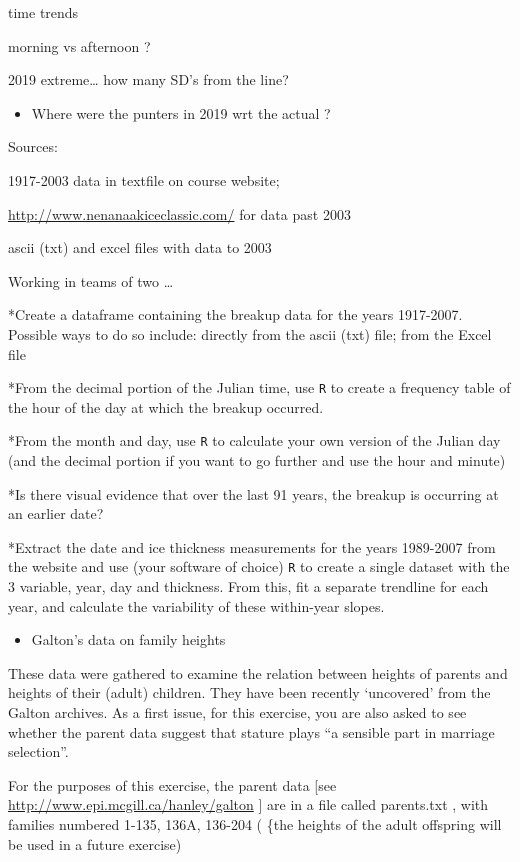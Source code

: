 \documentclass[]{book}
\providecommand{\tightlist}{%
  \setlength{\itemsep}{0pt}\setlength{\parskip}{0pt}}
\begin{document}
time trends

morning vs afternoon ?

2019 extreme\ldots{} how many SD's from the line?

\begin{itemize}
\tightlist
\item
  Where were the punters in 2019 wrt the actual ?
\end{itemize}

Sources:

1917-2003 data in textfile on course website;

\url{http://www.nenanaakiceclassic.com/} for data past 2003

ascii (txt) and excel files with data to 2003

Working in teams of two \ldots{}

*Create a dataframe containing the breakup data for the years 1917-2007. Possible ways to do so include: directly from the ascii (txt) file; from the Excel file

*From the decimal portion of the Julian time, use \texttt{R} to create a frequency table of the hour of the day at which the breakup occurred.

*From the month and day, use \texttt{R} to calculate your own version of the Julian day (and the decimal portion if you want to go further and use the hour and minute)

*Is there visual evidence that over the last 91 years, the breakup is occurring at an earlier date?

*Extract the date and ice thickness measurements for the years 1989-2007 from the website and use (your software of choice) \texttt{R} to create a single dataset with the 3 variable, year, day and thickness. From this, fit a separate trendline for each year, and calculate the variability of these within-year slopes.

\begin{itemize}
\tightlist
\item
  Galton's data on family heights
\end{itemize}

These data were gathered to examine the relation between heights of parents and heights of their (adult) children. They have been recently `uncovered' from the Galton archives. As a first issue, for this exercise, you are also asked to see whether the parent data suggest that stature plays ``a sensible part in marriage selection''.

For the purposes of this exercise, the parent data {[}see \url{http://www.epi.mcgill.ca/hanley/galton} {]} are in a file called parents.txt , with families numbered 1-135, 136A, 136-204 ( \{the heights of the adult offspring will be used in a future exercise)
\end{document}
